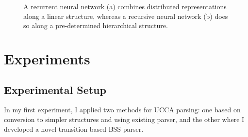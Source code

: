 \documentclass[11pt]{article}
\begin{document}
\begin{figure}[ht!]
  \begin{subfigure}{\textwidth}
  \parbox{.2\textwidth}{\caption{}\label{fig:rnn}}
  \parbox{.8\textwidth}{
  \centering
  }
  \end{subfigure}
  \begin{subfigure}{\textwidth}
  \parbox{.2\textwidth}{\caption{}\label{fig:recnn}}
  \parbox{.8\textwidth}{
  \centering
  }
  \end{subfigure}
  \caption{\label{fig:nns}
    A recurrent neural network (a) combines distributed representations along a
    linear structure, whereas a recursive neural network (b) does so along a
    pre-determined hierarchical structure.
  }
\end{figure}


\section{Experiments}\label{sec:experiments}

\subsection{Experimental Setup}\label{sec:setup}

In my first experiment, I applied two methods for UCCA parsing:
one based on conversion to simpler structures and using existing parser,
and the other where I developed a novel transition-based BSS parser.
\end{document}
